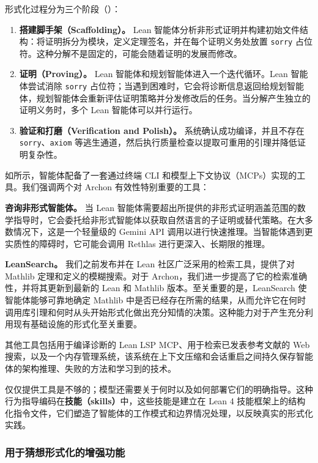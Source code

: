 ﻿\documentclass[]{pkuai4m}
\theoremstyle{plain}
\theoremstyle{definition}
\begin{document}
形式化过程分为三个阶段（）：
\begin{enumerate}
    \item \textbf{搭建脚手架（Scaffolding）。} Lean 智能体分析非形式证明并构建初始文件结构：将证明拆分为模块，定义定理签名，并在每个证明义务处放置 \texttt{sorry} 占位符。这种分解不是固定的，可能会随着证明的发展而修改。
    \item \textbf{证明（Proving）。} Lean 智能体和规划智能体进入一个迭代循环。Lean 智能体尝试消除 \texttt{sorry} 占位符；当遇到困难时，它会将诊断信息返回给规划智能体，规划智能体会重新评估证明策略并分发修改后的任务。当分解产生独立的证明义务时，多个 Lean 智能体可以并行运行。
    \item \textbf{验证和打磨（Verification and Polish）。} 系统确认成功编译，并且不存在 \texttt{sorry}、\texttt{axiom} 等逃生通道，然后执行质量检查以提取可重用的引理并降低证明复杂性。
\end{enumerate}

如所示，智能体配备了一套通过终端 CLI 和模型上下文协议（MCPs）实现的工具。我们强调两个对 Archon 有效性特别重要的工具：

\textbf{咨询非形式智能体。} 当 Lean 智能体需要超出所提供的非形式证明涵盖范围的数学指导时，它会委托给非形式智能体以获取自然语言的子证明或替代策略。在大多数情况下，这是一个轻量级的 Gemini API 调用以进行快速推理。当智能体遇到更实质性的障碍时，它可能会调用 Rethlas 进行更深入、长期限的推理。

\textbf{LeanSearch。} 我们之前发布并在 Lean 社区广泛采用的检索工具，提供了对 Mathlib 定理和定义的模糊搜索。对于 Archon，我们进一步提高了它的检索准确性，并将其更新到最新的 Lean 和 Mathlib 版本。至关重要的是，LeanSearch 使智能体能够可靠地确定 Mathlib 中是否已经存在所需的结果，从而允许它在何时调用库引理和何时从头开始形式化做出充分知情的决策。这种能力对于产生充分利用现有基础设施的形式化至关重要。

其他工具包括用于编译诊断的 Lean LSP MCP、用于检索已发表参考文献的 Web 搜索，以及一个内存管理系统，该系统在上下文压缩和会话重启之间持久保存智能体的架构推理、失败的方法和学习到的技术。

仅仅提供工具是不够的；模型还需要关于何时以及如何部署它们的明确指导。这种行为指导编码在\textbf{技能（skills）}中，这些技能是建立在 Lean 4 技能框架上的结构化指令文件，它们塑造了智能体的工作模式和边界情况处理，以反映真实的形式化实践。







\subsubsection{用于猜想形式化的增强功能\label{subsubsec:enhancements}}
\end{document}

